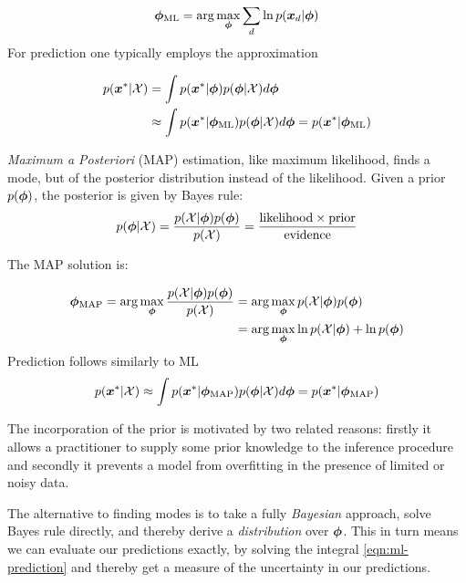 
\begin{align}
{ { {  \bm \phi  } }_{\text{ML}} } = \arg \max_{{ \bm \phi }} \sum_d \ln p({ \bm x_d } | { \bm \phi })
\end{align}
For prediction one typically employs the approximation

\begin{align}
p({ \bm x^{*} } | { \mathcal{X} }) 
&= \int p({ \bm x^{*} } | { \bm \phi }) p({ \bm \phi } | { \mathcal{X} }) d{ \bm \phi } \label{eqn:ml-prediction}\\
&\approx \int p({ \bm x^{*} } | { {{ \bm \phi }}_{\text{ML}} }) p({ \bm \phi } | { \mathcal{X} }) d{ \bm \phi }
=  p({ \bm x^{*} } | { {{ \bm \phi }}_{\text{ML}} })
\end{align}


\emph{Maximum a Posteriori} (MAP) estimation, like maximum likelihood, finds a mode, but of the posterior distribution instead of the likelihood. Given a prior $p({ \bm \phi })$, the posterior is given by Bayes rule:
\begin{align}
p({ \bm \phi } | { \mathcal{X} }) = \frac{p({ \mathcal{X} } | { \bm \phi })p({ \bm \phi })}{p({ \mathcal{X} })} = \frac{\text{likelihood} \times \text{prior}}{\text{evidence}}
\end{align}

The MAP solution is:

\begin{align}
{ { {  \bm \phi  } }_{\text{MAP}} } = \arg \max_{{ \bm \phi }} \frac{p({ \mathcal{X} } | { \bm \phi })p({ \bm \phi })}{p({ \mathcal{X} })}
 & = \arg \max_{{ \bm \phi }} p({ \mathcal{X} } | { \bm \phi })p({ \bm \phi }) \\
 & = \arg \max_{ \bm \phi } \ln p({ \mathcal{X} } | { \bm \phi }) + \ln p({ \bm \phi })
\end{align}
Prediction follows similarly to ML
\begin{align}
p({ \bm x^{*} } | { \mathcal{X} }) \approx \int p({ \bm x^{*} } | { {{ \bm \phi }}_{\text{MAP}} })p({ \bm \phi }|{ \mathcal{X} })d{ \bm \phi } = p({ \bm x^{*} } | { {{ \bm \phi }}_{\text{MAP}} })
\end{align}



The incorporation of the prior is motivated by two related reasons: firstly it allows a practitioner to supply some prior knowledge to the inference procedure and secondly it prevents a model from overfitting in the presence of limited or noisy data.

The alternative to finding modes is to take a fully \emph{Bayesian} approach, solve Bayes rule directly, and thereby derive a \emph{distribution} over ${ \bm \phi }$. This in turn means we can evaluate our predictions exactly, by solving the integral \eqref{eqn:ml-prediction} and thereby get a measure of the uncertainty in our predictions.

